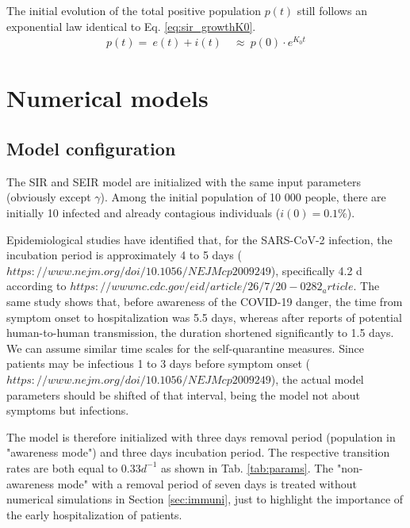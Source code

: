 \documentclass[DIV=12, BCOR=0pt]{scrartcl}  %
\begin{document}
 The initial evolution of the total positive population $p(t)$ still follows an exponential law identical to Eq. \ref{eq:sir_growthK0}.
 \begin{align}
		p(t) = \ e(t) + i(t) \quad \approx \  p(0) \cdot e^{K_0 t}
 \end{align}

 
	\section{Numerical models}
	\label{sec:numerical}
	
  \subsection{Model configuration}
	The SIR and SEIR model are initialized with the same input parameters (obviously except $\gamma$). Among the initial population of 10 000 people, there are initially 10 infected and already contagious individuals ($i(0) = 0.1 \%$).
	
	Epidemiological studies have identified that, for the SARS-CoV-2 infection, the incubation period is approximately 4 to 5 days ($https://www.nejm.org/doi/10.1056/NEJMcp2009249$), specifically 4.2 d according to $https://wwwnc.cdc.gov/eid/article/26/7/20-0282_article$. The same study shows that, before awareness of the COVID-19 danger, the time from symptom onset to hospitalization was 5.5 days, whereas after reports of potential human-to-human transmission, the duration shortened significantly to 1.5 days. We can assume similar time scales for the self-quarantine measures. Since patients may be infectious 1 to 3 days before symptom onset ($https://www.nejm.org/doi/10.1056/NEJMcp2009249$), the actual model parameters should be shifted of that interval, being the model not about symptoms but infections. 
	
  The model is therefore initialized with three days removal period (population in "awareness mode") and three days incubation period. 
  The respective transition rates are both equal to $0.33 d^{-1}$ as shown in Tab. \ref{tab:params}. 
  The "non-awareness mode" with a removal period of seven days is treated without numerical simulations in Section \ref{sec:immuni}, just to highlight the importance of the early hospitalization of patients. 
  
\end{document}
